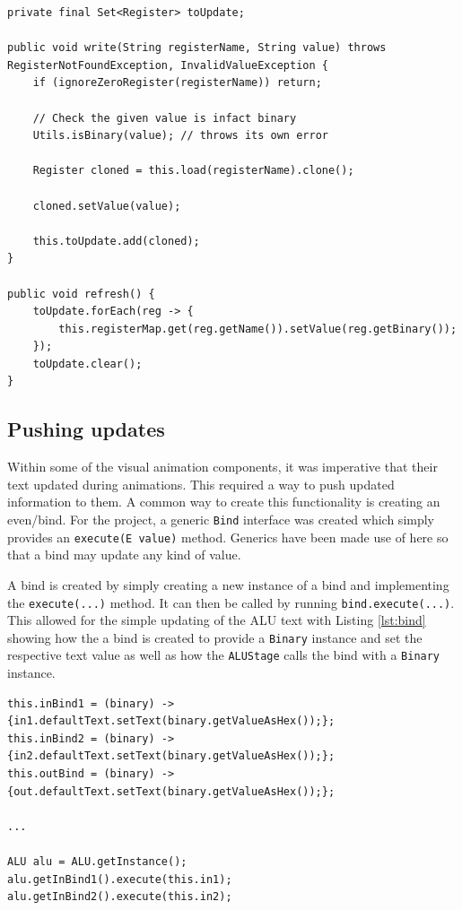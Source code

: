 \begin{lstlisting}[caption={Refresh mechanism, writing buffered register values}, label=lst:reg_buffer]
private final Set<Register> toUpdate;

public void write(String registerName, String value) throws RegisterNotFoundException, InvalidValueException {
    if (ignoreZeroRegister(registerName)) return;

    // Check the given value is infact binary
    Utils.isBinary(value); // throws its own error

    Register cloned = this.load(registerName).clone();

    cloned.setValue(value);

    this.toUpdate.add(cloned);
}
    
public void refresh() {
    toUpdate.forEach(reg -> {
        this.registerMap.get(reg.getName()).setValue(reg.getBinary());
    });
    toUpdate.clear();
}
\end{lstlisting}

\subsection{Pushing updates}
Within some of the visual animation components, it was imperative that their text updated during animations. This required a way to push updated information to them. A common way to create this functionality is creating an even/bind. For the project, a generic \texttt{Bind} interface was created which simply provides an \verb|execute(E value)| method. Generics have been made use of here so that a bind may update any kind of value. 

A bind is created by simply creating a new instance of a bind and implementing the \verb|execute(...)| method. It can then be called by running \verb|bind.execute(...)|. This allowed for the simple updating of the \ac{ALU} text with Listing \ref{lst:bind} showing how the a bind is created to provide a \texttt{Binary} instance and set the respective text value as well as how the \texttt{ALUStage} calls the bind with a \texttt{Binary} instance.

\begin{lstlisting}[caption=\ac{ALU} bind creation and execution, label=lst:bind]
this.inBind1 = (binary) -> {in1.defaultText.setText(binary.getValueAsHex());};
this.inBind2 = (binary) -> {in2.defaultText.setText(binary.getValueAsHex());};
this.outBind = (binary) -> {out.defaultText.setText(binary.getValueAsHex());};

...

ALU alu = ALU.getInstance();
alu.getInBind1().execute(this.in1); 
alu.getInBind2().execute(this.in2);
\end{lstlisting}

